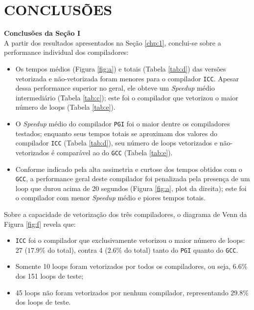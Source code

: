
\chapter{CONCLUSÕES}
\label{chp:3}

\vspace{4mm}
\textbf{Conclusões da Seção I}\vspace{6mm}\\
A partir dos resultados apresentados na Seção \ref{chp:1}, conclui-se sobre a performance individual dos compiladores:
\begin{itemize}
\item Os tempos médios (Figura \ref{fig:a}) e totais (Tabela \ref{tab:d}) das versões vetorizada e não-vetorizada foram menores para o compilador \texttt{ICC}. Apesar dessa performance superior no geral, ele obteve um \textit{Speedup} médio intermediário (Tabela \ref{tab:c}); este foi o compilador que vetorizou o maior número de loops (Tabela \ref{tab:e}).
%
\item O \textit{Speedup} médio do compilador \texttt{PGI} foi o maior dentre os compiladores testados; enquanto seus tempos totais se aproximam dos valores do compilador \texttt{ICC} (Tabela \ref{tab:d}), seu número de loops vetorizados e não-vetorizados é comparável ao do \texttt{GCC} (Tabela \ref{tab:e}).
%
\item Conforme indicado pela alta assimetria e curtose dos tempos obtidos com o \texttt{GCC}, a performance geral deste compilador foi penalizada pela presença de um loop que durou acima de 20 segundos (Figura \ref{fig:a}, plot da direita); este foi o compilador com menor \textit{Speedup} médio e piores tempos totais.
\end{itemize}

Sobre a capacidade de vetorização dos três compiladores, o diagrama de Venn da Figura \ref{fig:f} revela que:
\begin{itemize}
\item \texttt{ICC} foi o compilador que exclusivamente vetorizou o maior número de loops: 27 ($17.9\%$ do total), contra 4 ($2.6\%$ do total) tanto do \texttt{PGI} quanto do \texttt{GCC}.
\item Somente 10 loops foram vetorizados por todos os compiladores, ou seja, $6.6\%$ dos 151 loops de teste;
\item 45 loops não foram vetorizados por nenhum compilador, representando $29.8\%$ dos loops de teste.
\end{itemize}

